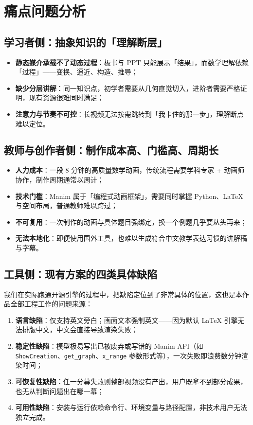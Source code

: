 \documentclass[11pt,a4paper]{ctexart}
\begin{document}
\section{痛点问题分析}

\subsection{学习者侧：抽象知识的「理解断层」}

\begin{itemize}
  \item \textbf{静态媒介承载不了动态过程}：板书与 PPT 只能展示「结果」，而数学理解依赖「过程」——变换、逼近、构造、推导；
  \item \textbf{缺少分层讲解}：同一知识点，初学者需要从几何直觉切入，进阶者需要严格证明，现有资源很难同时满足；
  \item \textbf{注意力与节奏不可控}：长视频无法按需跳转到「我卡住的那一步」，理解断点难以定位。
\end{itemize}

\subsection{教师与创作者侧：制作成本高、门槛高、周期长}

\begin{itemize}
  \item \textbf{人力成本}：一段 8 分钟的高质量数学动画，传统流程需要学科专家 + 动画师协作，制作周期通常以周计；
  \item \textbf{技术门槛}：Manim 属于「编程式动画框架」，需要同时掌握 Python、LaTeX 与空间布局，普通教师难以跨过；
  \item \textbf{不可复用}：一次制作的动画与具体题目强绑定，换一个例题几乎要从头再来；
  \item \textbf{无法本地化}：即便使用国外工具，也难以生成符合中文教学表达习惯的讲解稿与字幕。
\end{itemize}

\subsection{工具侧：现有方案的四类具体缺陷}

我们在实际跑通开源引擎的过程中，把缺陷定位到了非常具体的位置，这也是本作品全部工程工作的问题来源：

\begin{enumerate}
  \item \textbf{语言缺陷}：仅支持英文旁白；画面文本强制英文——因为默认 LaTeX 引擎无法排版中文，中文会直接导致渲染失败；
  \item \textbf{稳定性缺陷}：模型极易写出已被废弃或写错的 Manim API（如 \texttt{ShowCreation}、\texttt{get\_graph}、\texttt{x\_range} 参数形式等），一次失败即浪费数分钟渲染时间；
  \item \textbf{可恢复性缺陷}：任一分幕失败则整部视频没有产出，用户既拿不到部分成果，也无从判断问题出在哪一幕；
  \item \textbf{可用性缺陷}：安装与运行依赖命令行、环境变量与路径配置，非技术用户无法独立完成。
\end{enumerate}
\end{document}
